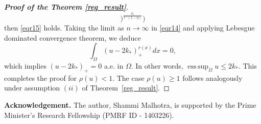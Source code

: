 \documentclass[11pt]{article}
\newcommand{\om} {\Omega}
\newcommand{\ds} {\displaystyle}
\begin{document}
\begin{proof}[\bf Proof of the Theorem \ref{reg_result}]
$$\Big )^{
\frac{\delta_{1}}{r^{-}(1-\eta)}}
\Big  )
$$
then \eqref{eqr15} holds.
Taking the limit as $n\to\infty$
in \eqref{eqr14} and applying Lebesgue 
dominated convergence theorem, we deduce
\begin{equation*}
\int_{\om}
\left (u-2k_{*}
\right )_+^{r(x)} dx=0,
\end{equation*}
which implies $
\left (u-2k_{*}
\right )_+=0$
a.e. in $\om.$
In other words, 
$\ds\operatorname*{ess\,sup}_{\Omega} u \leq 2k_*.$
This completes the proof for 
$\rho(u)<1.$
The case $\rho(u) \geq 1$
follows analogously under 
assumption $(ii)$
of Theorem~\ref{reg_result}.
\end{proof}

\noindent
{\bf Acknowledgement.}
The author, Shammi Malhotra, is supported by the 
Prime Minister’s Research Fellowship (PMRF ID - 1403226).
\end{document}
